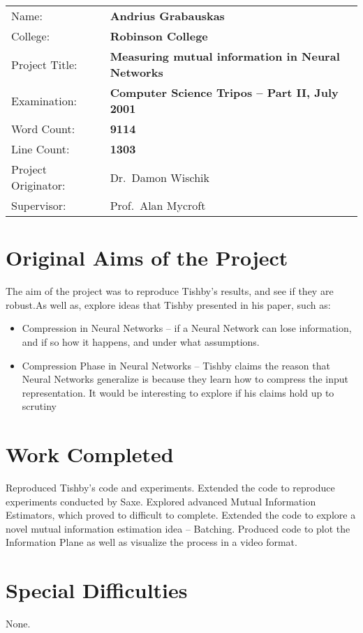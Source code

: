 \documentclass[dissertation.tex]{subfiles}
\begin{document}
{\large
\begin{tabular}{ll}
Name:               & \bf Andrius Grabauskas                    \\
College:            & \bf Robinson College                      \\
Project Title:      & \bf Measuring mutual information in Neural Networks \\
Examination:        & \bf Computer Science Tripos -- Part II, July 2001  \\
Word Count:         & \bf 9114\footnotemark[1] \\
Line Count:         & \bf 1303\footnotemark[2] \\
Project Originator: & Dr.\ Damon Wischik                  \\
Supervisor:         & Prof.\ Alan Mycroft                 \\ 
\end{tabular}
}


\section*{Original Aims of the Project}

The aim of the project was to reproduce Tishby's results, and see if they are
robust.As well as, explore ideas that Tishby presented in his paper, such as: 
\begin{itemize}
  \item{
      Compression in Neural Networks -- if a Neural Network can lose
      information, and if so how it happens, and under what assumptions.
    }
  \item{
      Compression Phase in Neural Networks -- Tishby claims the reason that
      Neural Networks generalize is because they learn how to compress the input
      representation. It would be interesting to explore if his claims hold up
      to scrutiny
    }
\end{itemize}

\section*{Work Completed}

Reproduced Tishby's code and experiments. Extended the code to reproduce
experiments conducted by Saxe. Explored advanced Mutual Information Estimators,
which proved to difficult to complete. Extended the code to explore a novel
mutual information estimation idea -- Batching. Produced code to plot the
Information Plane as well as visualize the process in a video format.

\section*{Special Difficulties}

None.

\newpage
\end{document}
